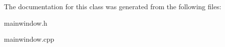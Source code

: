 The documentation for this class was generated from the following files\+:\begin{DoxyCompactItemize}
\item 
mainwindow.\+h\item 
mainwindow.\+cpp\end{DoxyCompactItemize}
